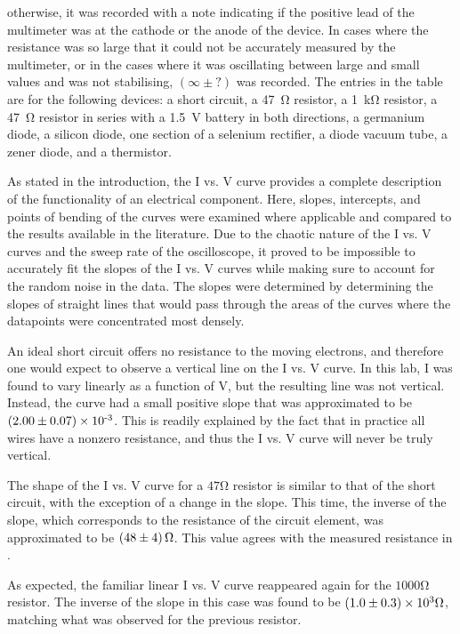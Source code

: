 \begin{paper}
{otherwise, it was recorded with a note indicating if the positive lead of the multimeter was at the cathode or the anode of the device.
In cases where the resistance was so large that it could not be accurately measured by the multimeter, or in the cases where it was oscillating between large and small values and was not stabilising, $(\infty\pm?)$ was recorded.
The entries in the table are for the following devices: a short circuit, a \SI{47}{\ohm} resistor, a \SI{1}{\kilo\ohm} resistor, a \SI{47}{\ohm} resistor in series with a \SI{1.5}{\volt} battery in both directions, a germanium diode, a silicon diode, one section of a selenium rectifier, a diode vacuum tube, a zener diode, and a thermistor.}
	
	
	As stated in the introduction, the I vs. V curve provides a complete description of the functionality of an electrical component. Here, slopes, intercepts, and points of bending of the curves were examined where applicable and compared to the results available in the literature. Due to the chaotic nature of the I vs. V curves and the sweep rate of the oscilloscope, it proved to be impossible to accurately fit the slopes of the I vs. V curves while making sure to account for the random noise in the data.
The slopes were determined by determining the slopes of straight lines that would pass through the areas of the curves where the datapoints were concentrated most densely.
	
	An ideal short circuit offers no resistance to the moving electrons, and therefore one would expect to observe a vertical line on the I vs. V curve. In this lab, I was found to vary linearly as a function of V, but the resulting line was not vertical. Instead, the curve had a small positive slope that was approximated to be \( \left(2.00 \pm 0.07\right) \times 10^\text{-3} \). This is readily explained by the fact that in practice all wires have a nonzero resistance, and thus the I vs. V curve will never be truly vertical.
	
	The shape of the I vs. V curve for a \( 47 \si{\ohm} \)  resistor is similar to that of the short circuit, with the exception of a change in the slope. This time, the inverse of the slope, which corresponds to the resistance of the circuit element, was approximated to be \( \left(48 \pm 4\right) \si{\ohm} \). This value agrees with the measured resistance in \figResistances.
	
	As expected, the familiar linear I vs. V curve reappeared again for the \( 1000 \si{\ohm} \) resistor. The inverse of the slope in this case was found to be \( \left(1.0 \pm 0.3\right) \times 10^3 \si{\ohm} \), matching what was observed for the previous resistor.
	

\end{paper}
